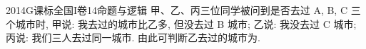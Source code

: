 
\begin{problem}{2014}{G}{课标全国I卷}{14}{命题与逻辑}
甲、乙、丙三位同学被问到是否去过 A, B, C 三个城市时,
甲说: 我去过的城市比乙多, 但没去过 B 城市;
乙说: 我没去过 C 城市;
丙说: 我们三人去过同一城市.
由此可判断乙去过的城市为\underline{\hspace{4em}}.
\end{problem}